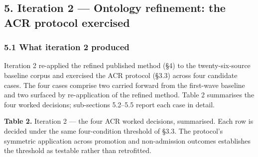 \documentclass[
]{article}
\begin{document}
\subsection{5. Iteration 2 --- Ontology refinement: the ACR protocol
exercised}\label{iteration-2-ontology-refinement-the-acr-protocol-exercised}

\subsubsection{5.1 What iteration 2
produced}\label{what-iteration-2-produced}

Iteration 2 re-applied the refined published method (§4) to the
twenty-six-source baseline corpus and exercised the ACR protocol (§3.3)
across four candidate cases. The four cases comprise two carried forward
from the first-wave baseline and two surfaced by re-application of the
refined method. Table 2 summarises the four worked decisions;
sub-sections 5.2--5.5 report each case in detail.

\textbf{Table 2.} Iteration 2 --- the four ACR worked decisions,
summarised. Each row is decided under the same four-condition threshold
of §3.3. The protocol's symmetric application across promotion and
non-admission outcomes establishes the threshold as testable rather than
retrofitted.
\end{document}
